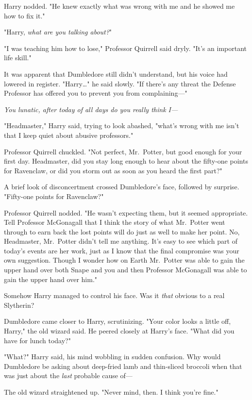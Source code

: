 Harry nodded. "He knew exactly what was wrong with me and he showed me how to fix it."

"Harry, \emph{what are you talking about?}"

"I was teaching him how to lose," Professor Quirrell said dryly. "It's an important life skill."

It was apparent that Dumbledore still didn't understand, but his voice had lowered in register. "Harry{\ldots}" he said slowly. "If there's any threat the Defense Professor has offered you to prevent you from complaining---"

\emph{You lunatic, after today of all days do you really think I---}

"Headmaster," Harry said, trying to look abashed, "what's wrong with me isn't that I keep quiet about abusive professors."

Professor Quirrell chuckled. "Not perfect, Mr.~Potter, but good enough for your first day. Headmaster, did you stay long enough to hear about the fifty-one points for Ravenclaw, or did you storm out as soon as you heard the first part?"

A brief look of disconcertment crossed Dumbledore's face, followed by surprise. "Fifty-one points for Ravenclaw?"

Professor Quirrell nodded. "He wasn't expecting them, but it seemed appropriate. Tell Professor McGonagall that I think the story of what Mr.~Potter went through to earn back the lost points will do just as well to make her point. No, Headmaster, Mr.~Potter didn't tell me anything. It's easy to see which part of today's events are her work, just as I know that the final compromise was your own suggestion. Though I wonder how on Earth Mr.~Potter was able to gain the upper hand over both Snape and you and then Professor McGonagall was able to gain the upper hand over him."

Somehow Harry managed to control his face. Was it \emph{that} obvious to a real Slytherin?

Dumbledore came closer to Harry, scrutinizing. "Your color looks a little off, Harry," the old wizard said. He peered closely at Harry's face. "What did you have for lunch today?"

"What?" Harry said, his mind wobbling in sudden confusion. Why would Dumbledore be asking about deep-fried lamb and thin-sliced broccoli when that was just about the \emph{last} probable cause of---

The old wizard straightened up. "Never mind, then. I think you're fine."

